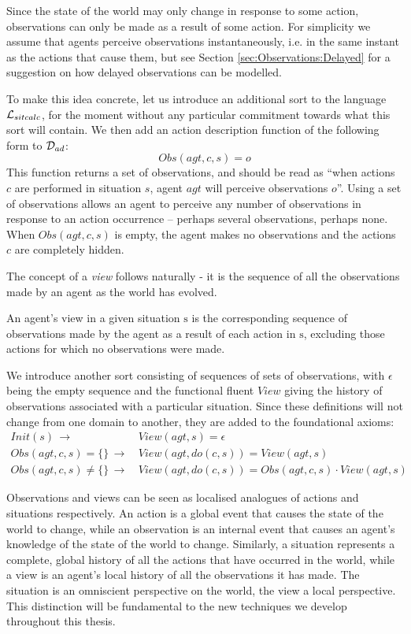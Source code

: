 Since the state of the world may only change in response to some action,
observations can only be made as a result of some action. For simplicity
we assume that agents perceive observations instantaneously, i.e.
in the same instant as the actions that cause them, but see Section
\ref{sec:Observations:Delayed} for a suggestion on how delayed observations
can be modelled.

To make this idea concrete, let us introduce an additional sort 
to the language $\mathcal{L}_{sitcalc}$, for the moment without any particular commitment
towards what this sort will contain. We then add an action description
function of the following form to $\mathcal{D}_{ad}$:\[
Obs(agt,c,s)=o\]
 This function returns a set of observations, and should be read as
{}``when actions $c$ are performed in situation $s$, agent $agt$
will perceive observations $o$''. Using a set of observations allows
an agent to perceive any number of observations in response to an
action occurrence -- perhaps several observations, perhaps none. When
$Obs(agt,c,s)$ is empty, the agent makes no observations and the
actions $c$ are completely hidden.

The concept of a \emph{view} follows naturally - it is the sequence
of all the observations made by an agent as the world has evolved.

\begin{defnL}
[{Views}] An agent's view in a given situation $\mathrm{s}$
is the corresponding sequence of observations made by the agent as
a result of each action in $\mathrm{s}$, excluding those actions
for which no observations were made. \label{defn:Observations:View} 
\end{defnL}
We introduce another sort  consisting of sequences of sets
of observations, with $\epsilon$ being the empty sequence and the
functional fluent $View$ giving the history of observations associated
with a particular situation. Since these definitions will not change
from one domain to another, they are added to the foundational axioms:\begin{align}
Init(s)\,\rightarrow & \, View(agt,s)=\epsilon\nonumber \\
Obs(agt,c,s)=\{\}\,\rightarrow & \, View(agt,do(c,s))=View(agt,s)\nonumber \\
Obs(agt,c,s)\neq\{\}\,\rightarrow & \, View(agt,do(c,s))=Obs(agt,c,s)\cdot View(agt,s)\label{eq:view_defn}\end{align}


Observations and views can be seen as localised analogues of actions
and situations respectively. An action is a global event that causes
the state of the world to change, while an observation is an internal
event that causes an agent's knowledge of the state of the world to
change. Similarly, a situation represents a complete, global history
of all the actions that have occurred in the world, while a view is
an agent's local history of all the observations it has made. The
situation is an omniscient perspective on the world, the view a local
perspective. This distinction will be fundamental to the new techniques
we develop throughout this thesis.

